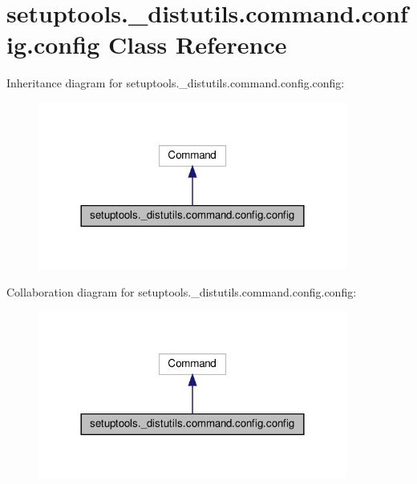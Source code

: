 \hypertarget{classsetuptools_1_1__distutils_1_1command_1_1config_1_1config}{}\section{setuptools.\+\_\+distutils.\+command.\+config.\+config Class Reference}
\label{classsetuptools_1_1__distutils_1_1command_1_1config_1_1config}


Inheritance diagram for setuptools.\+\_\+distutils.\+command.\+config.\+config\+:
\nopagebreak
\begin{figure}[H]
\begin{center}
\leavevmode
\includegraphics[width=288pt]{classsetuptools_1_1__distutils_1_1command_1_1config_1_1config__inherit__graph}
\end{center}
\end{figure}


Collaboration diagram for setuptools.\+\_\+distutils.\+command.\+config.\+config\+:
\nopagebreak
\begin{figure}[H]
\begin{center}
\leavevmode
\includegraphics[width=288pt]{classsetuptools_1_1__distutils_1_1command_1_1config_1_1config__coll__graph}
\end{center}
\end{figure}

